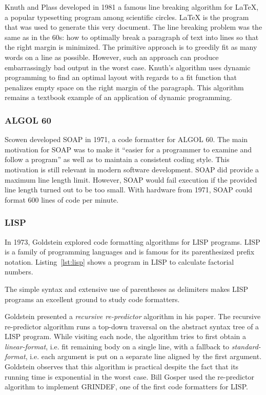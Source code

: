 Knuth and Plass developed in 1981 a famous line breaking algorithm\autocite{knuth_breaking_1981} for \LaTeX{}, a popular typesetting program among scientific circles.
\LaTeX{} is the program that was used to generate this very document.
The line breaking problem was the same as in the 60s: how to optimally break a paragraph of text into lines so that the right margin is minimized.
The primitive approach is to greedily fit as many words on a line as possible.
However, such an approach can produce embarrassingly bad output in the worst case.
Knuth's algorithm uses dynamic programming to find an optimal layout with regards to a fit function that penalizes empty space on the right margin of the paragraph.
This algorithm remains a textbook example of an application of dynamic programming\autocite{dreyfus2002richard,kleinberg2006algorithm}.

\subsubsection{ALGOL 60}
Scowen\autocite{scowen_soapprogram_1971} developed SOAP in 1971, a code formatter for ALGOL 60.
The main motivation for SOAP was to make it ``easier for a programmer to examine and follow a program'' as well as to maintain a consistent coding style.
This motivation is still relevant in modern software development.
SOAP did provide a maximum line length limit.
However, SOAP would fail execution if the provided line length turned out to be too small.
With hardware from 1971, SOAP could format 600 lines of code per minute.

\subsubsection{LISP}\label{sec:lisp}
In 1973, Goldstein\autocite{goldstein_pretty-printing_1973} explored code formatting algorithms for LISP\autocite{mccarthy_recursive_1960} programs.
LISP is a family of programming languages and is famous for its parenthesized prefix notation.
Listing~\ref{lst:lisp} shows a program in LISP to calculate factorial numbers.

The simple syntax and extensive use of parentheses as delimiters makes LISP programs an excellent ground to study code formatters.

Goldstein presented a \emph{recursive re-predictor} algorithm in his paper.
The recursive re-predictor algorithm runs a top-down traversal on the abstract syntax tree of a LISP program.
While visiting each node, the algorithm tries to first obtain a \emph{linear-format},
i.e. fit remaining body on a single line,
with a fallback to \emph{standard-format},
i.e. each argument is put on a separate line aligned by the first argument.
Goldstein observes that this algorithm is practical despite the fact that its running time is exponential in the worst case.
Bill Gosper used the re-predictor algorithm to implement GRINDEF\autocite{_bill_????}, one of the first code formatters for LISP.

